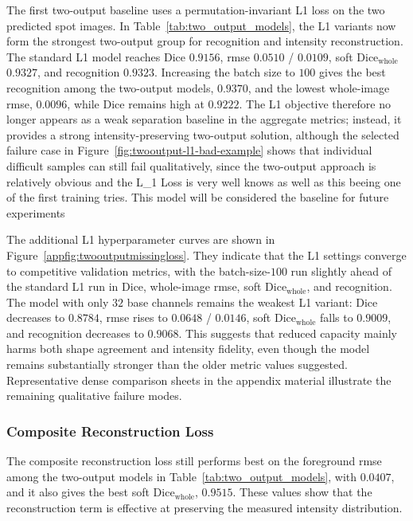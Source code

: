 The first two-output baseline uses a permutation-invariant L1 loss on the two predicted spot images. In Table~\ref{tab:two_output_models}, the L1 variants now form the strongest two-output group for recognition and intensity reconstruction. The standard L1 model reaches Dice $0.9156$, \gls{rmse} $0.0510$ / $0.0109$, soft Dice$_{\mathrm{whole}}$ $0.9327$, and recognition $0.9323$. Increasing the batch size to $100$ gives the best recognition among the two-output models, $0.9370$, and the lowest whole-image \gls{rmse}, $0.0096$, while Dice remains high at $0.9222$. The L1 objective therefore no longer appears as a weak separation baseline in the aggregate metrics; instead, it provides a strong intensity-preserving two-output solution, although the selected failure case in Figure~\ref{fig:twooutput-l1-bad-example} shows that individual difficult samples can still fail qualitatively, since the two-output approach is relatively obvious and the L\_1 Loss is very well knows as well as this beeing one of the first training tries. This model will be considered the baseline for future experiments

The additional L1 hyperparameter curves are shown in Figure~\ref{appfig:twooutputmissingloss}. They indicate that the L1 settings converge to competitive validation metrics, with the batch-size-$100$ run slightly ahead of the standard L1 run in Dice, whole-image \gls{rmse}, soft Dice$_{\mathrm{whole}}$, and recognition. The model with only $32$ base channels remains the weakest L1 variant: Dice decreases to $0.8784$, \gls{rmse} rises to $0.0648$ / $0.0146$, soft Dice$_{\mathrm{whole}}$ falls to $0.9009$, and recognition decreases to $0.9068$. This suggests that reduced capacity mainly harms both shape agreement and intensity fidelity, even though the model remains substantially stronger than the older metric values suggested. Representative dense comparison sheets in the appendix material illustrate the remaining qualitative failure modes.

\subsubsection{Composite Reconstruction Loss}

The composite reconstruction loss still performs best on the foreground \gls{rmse} among the two-output models in Table~\ref{tab:two_output_models}, with $0.0407$, and it also gives the best soft Dice$_{\mathrm{whole}}$, $0.9515$. These values show that the reconstruction term is effective at preserving the measured intensity distribution.

